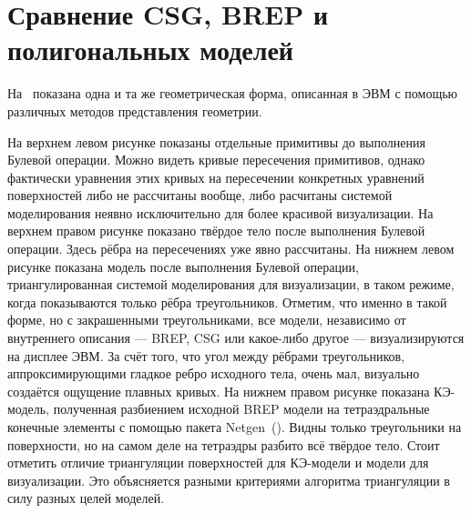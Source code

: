 \section{Сравнение CSG, BREP и полигональных моделей}

На~ показана одна и та же геометрическая форма, описанная в ЭВМ с помощью различных методов представления геометрии.

На верхнем левом рисунке показаны отдельные примитивы до выполнения Булевой операции. Можно видеть кривые пересечения примитивов, однако фактически уравнения этих кривых на пересечении конкретных уравнений поверхностей либо не рассчитаны вообще, либо расчитаны системой моделирования неявно исключительно для более красивой визуализации.
На верхнем правом рисунке показано твёрдое тело после выполнения Булевой операции. Здесь рёбра на пересечениях уже явно рассчитаны.
На нижнем левом рисунке показана модель после выполнения Булевой операции, триангулированная системой моделирования для визуализации, в таком режиме, когда показываются только рёбра треугольников. Отметим, что именно в такой форме, но с закрашенными треугольниками, все модели, независимо от внутреннего описания --- BREP, CSG или какое-либо другое --- визуализируются на дисплее ЭВМ. За счёт того, что угол между рёбрами треугольников, аппроксимирующими гладкое ребро исходного тела, очень мал, визуально создаётся ощущение плавных кривых.
На нижнем правом рисунке показана КЭ-модель, полученная разбиением исходной BREP модели на тетраэдральные конечные элементы с помощью пакета Netgen~(\cite{}). Видны только треугольники на поверхности, но на самом деле на тетраэдры разбито всё твёрдое тело.
Стоит отметить отличие триангуляции поверхностей для КЭ-модели и модели для визуализации. Это объясняется разными критериями алгоритма триангуляции в силу разных целей моделей.

